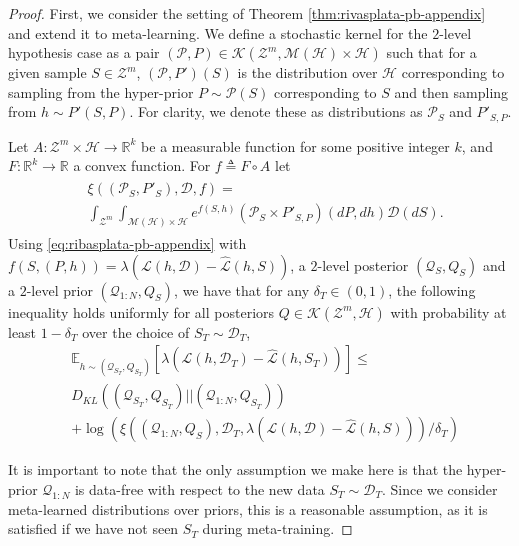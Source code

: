 \documentclass{article} %
\theoremstyle{definition}
\newcommand{\Expect}[2]{\mathbb{E}_{#1}\left [#2 \right ]}
\begin{document}
\begin{proof}
	First, we consider the setting of Theorem \ref{thm:rivasplata-pb-appendix} and extend it to meta-learning. We define a stochastic kernel for the $2$-level hypothesis case as a pair $(\mathcal{P},P)\in \mathcal{K}(\mathcal{Z}^m, \mathcal{M}(\mathcal{H})\times \mathcal{H})$ such that for a given sample $S\in \mathcal{Z}^m$,  $(\mathcal{P},P')(S)$ is the distribution over $\mathcal{H}$ corresponding to sampling from the hyper-prior $P\sim \mathcal{P}(S)$ corresponding to $S$ and then sampling from $h\sim P'(S, P)$. For clarity, we denote these as distributions as $\mathcal{P}_S$ and $P'_{S,P}$. 
	
	Let $A: \mathcal{Z}^m\times \mathcal{H}\rightarrow \mathbb{R}^k$ be a measurable function for some positive integer $k$, and $F:\mathbb{R}^k\rightarrow \mathbb{R}$ a convex function.
	For $f\triangleq F\circ A$ let 
	\begin{align*} 
	\begin{split}
	&\xi((\mathcal{P}_S,P'_S), \mathcal{D}, f)=\\
	&\int_{\mathcal{Z}^m}\int_{\mathcal{M}(\mathcal{H})\times\mathcal{H}}e^{f(S, h)}\left(\mathcal{P}_S\times P'_{S,P}\right)(dP,dh)\mathcal{D}(dS) .
	\end{split}
	\end{align*}
%	
	Using \eqref{eq:ribasplata-pb-appendix} with $f(S,(P,h))=\lambda(\mathcal{L}(h,\mathcal{D})-\hat{\mathcal{L}}(h,S))$, a $2$-level posterior $(\mathcal{Q}_S, Q_S)$ and a $2$-level prior $(\mathcal{Q}_{1:N}, Q_S)$,
	we have that for any $\delta_T \in (0,1)$, the following inequality holds uniformly for all posteriors $Q\in \mathcal{K}(\mathcal{Z}^m, \mathcal{H})$ with probability at least $1-\delta_T$ over the choice of $S_T\sim \mathcal{D}_T$,
%	
	\begin{equation} \label{eq:appendix-proof-eq}
	\begin{split}
	&\Expect{h\sim (\mathcal{Q}_{S_T}, Q_{S_T})}{\lambda(\mathcal{L}(h,\mathcal{D}_T)-\hat{\mathcal{L}}(h,S_T))} \leq \\ &D_{KL}((\mathcal{Q}_{S_T}, Q_{S_T})||(\mathcal{Q}_{1:N}, Q_{S_T}))\\
	&+\log\left (\xi\left ((\mathcal{Q}_{1:N}, Q_S), \mathcal{D}_T, \lambda(\mathcal{L}(h,\mathcal{D})-\hat{\mathcal{L}}(h,S))\right )/\delta_T\right )
	\end{split}
	\end{equation}
	
	It is important to note that the only assumption we make here is that the hyper-prior $\mathcal{Q}_{1:N}$ is data-free with respect to the new data $S_T\sim \mathcal{D}_T$. Since we consider meta-learned distributions over priors, this is a reasonable assumption, as it is satisfied if we have not seen $S_T$ during meta-training.
	

\end{proof}
\end{document}
